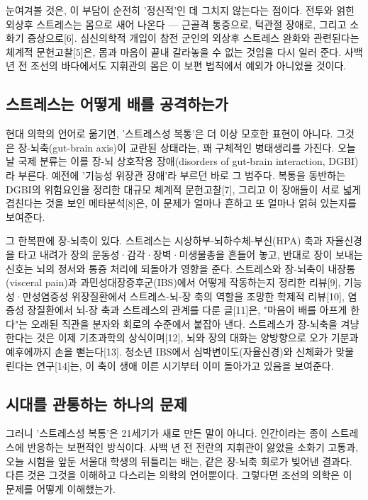 \documentclass[12pt,oneside]{book}
\begin{document}
눈여겨볼 것은, 이 부담이 순전히 '정신적'인 데 그치지 않는다는 점이다. 전투와 얽힌 외상후 스트레스는 몸으로 새어 나온다 — 근골격 통증으로, 턱관절 장애로, 그리고 소화기 증상으로[6]. 심신의학적 개입이 참전 군인의 외상후 스트레스 완화와 관련된다는 체계적 문헌고찰[5]은, 몸과 마음이 끝내 갈라놓을 수 없는 것임을 다시 일러 준다. 사백 년 전 조선의 바다에서도 지휘관의 몸은 이 보편 법칙에서 예외가 아니었을 것이다.

\subsection{스트레스는 어떻게 배를 공격하는가}

현대 의학의 언어로 옮기면, '스트레스성 복통'은 더 이상 모호한 표현이 아니다. 그것은 장-뇌축(gut-brain axis)이 교란된 상태라는, 꽤 구체적인 병태생리를 가진다. 오늘날 국제 분류는 이를 장-뇌 상호작용 장애(disorders of gut-brain interaction, DGBI)라 부른다. 예전에 '기능성 위장관 장애'라 부르던 바로 그 범주다. 복통을 동반하는 DGBI의 위험요인을 정리한 대규모 체계적 문헌고찰[7], 그리고 이 장애들이 서로 넓게 겹친다는 것을 보인 메타분석[8]은, 이 문제가 얼마나 흔하고 또 얼마나 얽혀 있는지를 보여준다.

그 한복판에 장-뇌축이 있다. 스트레스는 시상하부-뇌하수체-부신(HPA) 축과 자율신경을 타고 내려가 장의 운동성·감각·장벽·미생물총을 흔들어 놓고, 반대로 장이 보내는 신호는 뇌의 정서와 통증 처리에 되돌아가 영향을 준다. 스트레스와 장-뇌축이 내장통(visceral pain)과 과민성대장증후군(IBS)에서 어떻게 작동하는지 정리한 리뷰[9], 기능성·만성염증성 위장질환에서 스트레스-뇌-장 축의 역할을 조망한 학제적 리뷰[10], 염증성 장질환에서 뇌-장 축과 스트레스의 관계를 다룬 글[11]은, "마음이 배를 아프게 한다"는 오래된 직관을 분자와 회로의 수준에서 붙잡아 낸다. 스트레스가 장-뇌축을 겨냥한다는 것은 이제 기초과학의 상식이며[12], 뇌와 장의 대화는 양방향으로 오가 기분과 예후에까지 손을 뻗는다[13]. 청소년 IBS에서 심박변이도(자율신경)와 신체화가 맞물린다는 연구[14]는, 이 축이 생애 이른 시기부터 이미 돌아가고 있음을 보여준다.

\subsection{시대를 관통하는 하나의 문제}

그러니 '스트레스성 복통'은 21세기가 새로 만든 말이 아니다. 인간이라는 종이 스트레스에 반응하는 보편적인 방식이다. 사백 년 전 전란의 지휘관이 앓았을 소화기 고통과, 오늘 시험을 앞둔 서울대 학생의 뒤틀리는 배는, 같은 장-뇌축 회로가 빚어낸 결과다. 다른 것은 그것을 이해하고 다스리는 의학의 언어뿐이다. 그렇다면 조선의 의학은 이 문제를 어떻게 이해했는가.
\end{document}
